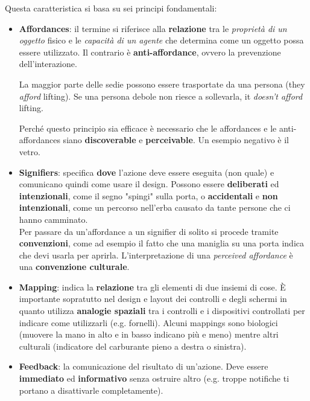 Questa caratteristica si basa su sei principi fondamentali:
\begin{itemize}
	\item \textbf{Affordances}: il termine si riferisce alla \textbf{relazione} tra le \textit{proprietà di un oggetto} fisico e le \textit{capacità di un agente} che determina come un oggetto possa essere utilizzato. Il contrario è \textbf{anti-affordance}, ovvero la prevenzione dell'interazione.
	\begin{example}
		La maggior parte delle sedie possono essere trasportate da una persona (they \textit{afford} lifting). Se una persona debole non riesce a sollevarla, it \textit{doesn't afford} lifting.
	\end{example}
	Perché questo principio sia efficace è necessario che le affordances e le anti-affordances siano \textbf{discoverable} e \textbf{perceivable}. Un esempio negativo è il vetro.
	
	\item \textbf{Signifiers}: specifica \textbf{dove} l'azione deve essere eseguita (non quale) e comunicano quindi come usare il design. Possono essere \textbf{deliberati} ed \textbf{intenzionali}, come il segno "spingi" sulla porta, o \textbf{accidentali} e \textbf{non intenzionali}, come un percorso nell'erba causato da tante persone che ci hanno camminato.\\
	Per passare da un'affordance a un signifier di solito si procede tramite \textbf{convenzioni}, come ad esempio il fatto che una maniglia su una porta indica che devi usarla per aprirla. L'interpretazione di una \textit{perceived affordance} è una \textbf{convenzione culturale}.
	
	\item \textbf{Mapping}: indica la \textbf{relazione} tra gli elementi di due insiemi di cose. È importante sopratutto nel design e layout dei controlli e degli schermi in quanto utilizza \textbf{analogie spaziali} tra i controlli e i dispositivi controllati per indicare come utilizzarli (e.g. fornelli). Alcuni mappings sono biologici (muovere la mano in alto e in basso indicano più e meno) mentre altri culturali (indicatore del carburante pieno a destra o sinistra).
	
	\item \textbf{Feedback}: la comunicazione del risultato di un'azione. Deve essere \textbf{immediato} ed \textbf{informativo} senza ostruire altro (e.g. troppe notifiche ti portano a disattivarle completamente).
	

\end{itemize}
